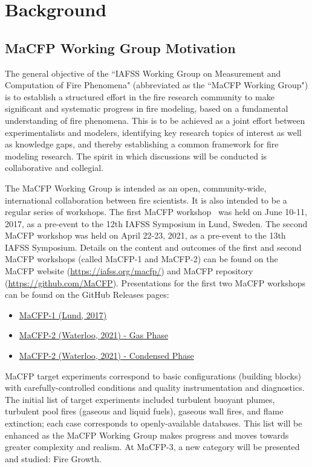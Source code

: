 \documentclass[12pt]{article}
\begin{document}
\newpage
\thispagestyle{empty}
\tableofcontents

\pagestyle{empty}
\newpage
\section{Background}
\label{Sec:Background}
\subsection{MaCFP Working Group Motivation}
The general objective of the ``IAFSS Working Group on Measurement and Computation of Fire Phenomena" (abbreviated as the ``MaCFP Working Group") is to establish a structured effort in the fire research community to make significant and systematic progress in fire modeling, based on a fundamental understanding of fire phenomena. This is to be achieved as a joint effort between experimentalists and modelers, identifying key research topics of interest as well as knowledge gaps, and thereby establishing a common framework for fire modeling research. The spirit in which discussions will be conducted is collaborative and collegial.

The MaCFP Working Group is intended as an open, community-wide, international collaboration between fire scientists. It is also intended to be a regular series of workshops. The first MaCFP workshop~\cite{brown2018proceedings} was held on June 10-11, 2017, as a pre-event to the 12th IAFSS Symposium in Lund, Sweden. The second MaCFP workshop was held on April 22-23, 2021, as a pre-event to the 13th IAFSS Symposium. Details on the content and outcomes of the first and second MaCFP workshops (called MaCFP-1 and MaCFP-2) can be found on the MaCFP website (\url{https://iafss.org/macfp/}) and MaCFP repository (\url{https://github.com/MaCFP}). Presentations for the first two MaCFP workshops can be found on the GitHub Releases pages:
\begin{itemize}[noitemsep]
 \item \href{https://github.com/MaCFP/macfp-db/releases/tag/macfp-1.0}{MaCFP-1 (Lund, 2017)}
 \item \href{https://github.com/MaCFP/macfp-db/releases/tag/macfp-2.0}{MaCFP-2 (Waterloo, 2021) - Gas Phase}
 \item \href{https://github.com/MaCFP/matl-db/releases/tag/v1.1.0}{MaCFP-2 (Waterloo, 2021) - Condensed Phase}
\end{itemize}

MaCFP target experiments correspond to basic configurations (building blocks) with carefully-controlled conditions and quality instrumentation and diagnostics. The initial list of target experiments included turbulent buoyant plumes, turbulent pool fires (gaseous and liquid fuels), gaseous wall fires, and flame extinction; each case corresponds to openly-available databases. This list will be enhanced as the MaCFP Working Group makes progress and moves towards greater complexity and realism. At MaCFP-3, a new category will be presented and studied: Fire Growth.
\end{document}
